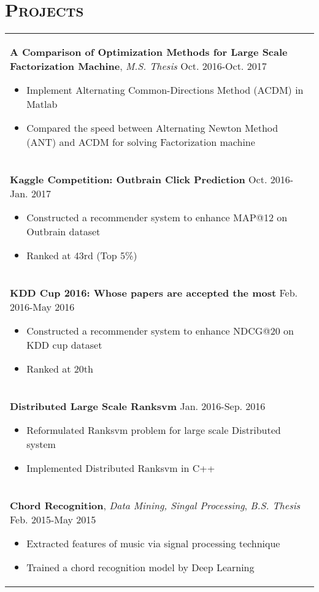 \documentclass[a4paper,11pt]{article} %
\begin{document}
\section{\Large\bf\textsc{Projects}}
\begin{tabular}{p{18.5cm}}

{\bf{A Comparison of Optimization Methods for Large
Scale Factorization Machine}},  {\it{M.S. Thesis}} \hfill Oct. 2016-Oct. 2017
\begin{itemize}
\item Implement Alternating Common-Directions Method (ACDM) in Matlab 
\item Compared the speed between Alternating Newton Method (ANT) and ACDM for solving Factorization machine 
\vspace*{-\baselineskip}
\end{itemize} \\
\vspace{.1mm}
{\bf{Kaggle Competition: Outbrain Click Prediction}}  \hfill Oct. 2016-Jan. 2017
\begin{itemize}
\item Constructed a recommender system to enhance MAP@12 on Outbrain dataset
\item Ranked at 43rd (Top 5\%) 
\vspace*{-\baselineskip}
\end{itemize}\\
\vspace{.1mm}
{\bf{KDD Cup 2016: Whose papers are accepted the most}}  \hfill Feb. 2016-May 2016
\begin{itemize}
\item Constructed a recommender system to enhance NDCG@20 on KDD cup dataset
\item Ranked at 20th
\vspace*{-\baselineskip}
\end{itemize}\\
\vspace{.1mm}
{\bf{Distributed Large Scale Ranksvm}} \hfill Jan. 2016-Sep. 2016
\begin{itemize}%
\item Reformulated Ranksvm problem for large scale Distributed system
\item Implemented Distributed Ranksvm in C++
\vspace*{-\baselineskip}
\end{itemize}\\
\vspace{.1mm}
{\bf{Chord Recognition}}, {\it{Data Mining, Singal Processing}}, {\it{B.S. Thesis}} \hfill Feb. 2015-May 2015
\begin{itemize}
\item Extracted features of music via signal processing technique
\item Trained a chord recognition model by Deep Learning
\end{itemize}\\
\end{tabular}
\vspace*{-\baselineskip}
%
%
\end{document}
